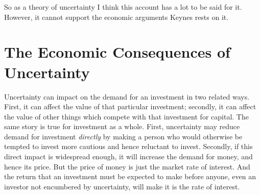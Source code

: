 \documentclass[
  10pt,
  letterpaper,
  DIV=11,
  numbers=noendperiod,
  twoside]{scrartcl}
\begin{document}
So as a theory of uncertainty I think this account has a lot to be said
for it. However, it cannot support the economic arguments Keynes rests
on it.

\section{The Economic Consequences of
Uncertainty}\label{the-economic-consequences-of-uncertainty}

Uncertainty can impact on the demand for an investment in two related
ways. First, it can affect the value of that particular investment;
secondly, it can affect the value of other things which compete with
that investment for capital. The same story is true for investment as a
whole. First, uncertainty may reduce demand for investment
\emph{directly} by making a person who would otherwise be tempted to
invest more cautious and hence reluctant to invest. Secondly, if this
direct impact is widespread enough, it will increase the demand for
money, and hence its price. But the price of money is just the market
rate of interest. And the return that an investment must be expected to
make before anyone, even an investor not encumbered by uncertainty, will
make it is the rate of interest.
\end{document}
